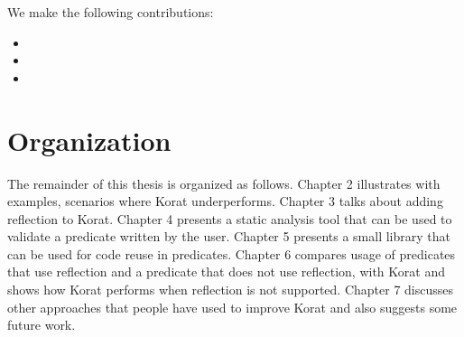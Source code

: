 \begin{comment}
A DEF-USE
ANALYSIS IS A DATA-FLOW Analysis Which Helps In Statically
accumulating def-use and use-def chains. 

Specifically, we utilize use-def chains, where each chain is a data
structure that consists of a use, U, of a variable, and all the
definitions, D, of that variable that can reach that use without any
other intervening definitions. 

Once the RepOkValidator has access to the use-def chain of the
predicate, it checks the chain to see if a few properties (mentioned
in chapter 4) that affect Korat’s efficiency are not violated.


Static program analysis is the analysis of a piece of code without
actually executing the piece of code. The sophistication of the
analysis performed by different tools varies from those that only
consider the behavior of individual statements and declarations, to
those that include the complete source code of a program in their
analysis.

a badly written predicate can deteriorate the efficiency of
Korat, we propose a static analysis of the predicate to identify
places (if any) where the predicate can be improved. Chapter 4
presents \emph{RepOkValidator}, a tool that uses \emph{def-use}
analysis to check if the predicate written by the user affects the
efficiency of Korat.
\end{comment}


We make the following contributions:

\begin{itemize}
\item 
\item 
\item 
\end{itemize}

\section{Organization}
The remainder of this thesis is organized as follows. Chapter 2 illustrates with examples, scenarios where Korat underperforms. Chapter 3 talks about adding reflection to Korat. Chapter 4 presents a static analysis tool that can be used to validate a predicate written by the user. Chapter 5 presents a small library that can be used for code reuse in predicates. Chapter 6 compares usage of predicates that use reflection and a predicate that does not use reflection, with Korat and shows how Korat performs when reflection is not supported. Chapter 7 discusses other approaches that people have used to improve Korat and also suggests some future work.
